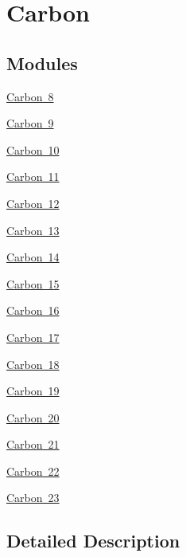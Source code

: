 \hypertarget{group___isotope_const-_carbon}{}\section{Carbon}
\label{group___isotope_const-_carbon}
\subsection*{Modules}
\begin{DoxyCompactItemize}
\item 
\mbox{\hyperlink{group___isotope_const-_carbon-_c8}{Carbon 8}}
\item 
\mbox{\hyperlink{group___isotope_const-_carbon-_c9}{Carbon 9}}
\item 
\mbox{\hyperlink{group___isotope_const-_carbon-_c10}{Carbon 10}}
\item 
\mbox{\hyperlink{group___isotope_const-_carbon-_c11}{Carbon 11}}
\item 
\mbox{\hyperlink{group___isotope_const-_carbon-_c12}{Carbon 12}}
\item 
\mbox{\hyperlink{group___isotope_const-_carbon-_c13}{Carbon 13}}
\item 
\mbox{\hyperlink{group___isotope_const-_carbon-_c14}{Carbon 14}}
\item 
\mbox{\hyperlink{group___isotope_const-_carbon-_c15}{Carbon 15}}
\item 
\mbox{\hyperlink{group___isotope_const-_carbon-_c16}{Carbon 16}}
\item 
\mbox{\hyperlink{group___isotope_const-_carbon-_c17}{Carbon 17}}
\item 
\mbox{\hyperlink{group___isotope_const-_carbon-_c18}{Carbon 18}}
\item 
\mbox{\hyperlink{group___isotope_const-_carbon-_c19}{Carbon 19}}
\item 
\mbox{\hyperlink{group___isotope_const-_carbon-_c20}{Carbon 20}}
\item 
\mbox{\hyperlink{group___isotope_const-_carbon-_c21}{Carbon 21}}
\item 
\mbox{\hyperlink{group___isotope_const-_carbon-_c22}{Carbon 22}}
\item 
\mbox{\hyperlink{group___isotope_const-_carbon-_c23}{Carbon 23}}
\end{DoxyCompactItemize}


\subsection{Detailed Description}
